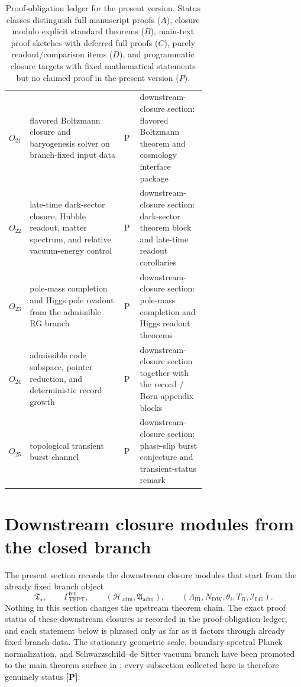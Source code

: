 \documentclass[11pt,a4paper]{article}
\theoremstyle{definition}
\theoremstyle{remark}
\newcommand{\Tstar}{\mathfrak T_{\star}}
\begin{document}
\begin{table}[p]
\begin{tabularx}{\linewidth}{@{}>{\raggedright\arraybackslash}p{0.10\linewidth}>{\raggedright\arraybackslash}p{0.48\linewidth}>{\centering\arraybackslash}p{0.08\linewidth}Y@{}}
$O_{21}$ & flavored Boltzmann closure and baryogenesis solver on branch-fixed input data & P & downstream-closure section: flavored Boltzmann theorem and cosmology interface package \\
$O_{22}$ & late-time dark-sector closure, Hubble readout, matter spectrum, and relative vacuum-energy control & P & downstream-closure section: dark-sector theorem block and late-time readout corollaries \\
$O_{23}$ & pole-mass completion and Higgs pole readout from the admissible RG branch & P & downstream-closure section: pole-mass completion and Higgs readout theorems \\
$O_{24}$ & admissible code subspace, pointer reduction, and deterministic record growth & P & downstream-closure section together with the record / Born appendix blocks \\
$O_{25}$ & topological transient burst channel & P & downstream-closure section: phase-slip burst conjecture and transient-status remark \\
\bottomrule
\end{tabularx}
\caption{Proof-obligation ledger for the present version. Status classes distinguish full manuscript proofs ($A$), closure modulo explicit standard theorems ($B$), main-text proof sketches with deferred full proofs ($C$), purely readout/comparison items ($D$), and programmatic closure targets with fixed mathematical statements but no claimed proof in the present version ($P$).}
\label{tab:proof-obligation-ledger}
\end{table}

\section{Downstream closure modules from the closed branch}
\label{sec:downstream_closure_modules}

The present section records the downstream closure modules that start from the already fixed branch
object
\[
\Tstar,
\qquad
\Gamma_{\mathrm{TFPT}}^{\mathrm{ren}},
\qquad
(\mathcal H_{\mathrm{adm}},\mathfrak A_{\mathrm{adm}}),
\qquad
(\Lambda_{\mathrm{IR}},N_{\mathrm{DW}},\theta_i,T_R,\mathcal I_{\mathrm{LG}}).
\]
Nothing in this section changes the upstream theorem chain. The exact proof status of these
downstream closures is recorded in the proof-obligation ledger, and each statement below is phrased
only as far as it factors through already fixed branch data. The stationary geometric scale,
boundary-spectral Planck normalization, and Schwarzschild--de Sitter vacuum branch have been
promoted to the main theorem surface in ; every
subsection collected here is therefore genuinely status \textbf{[P]}.
\end{document}
